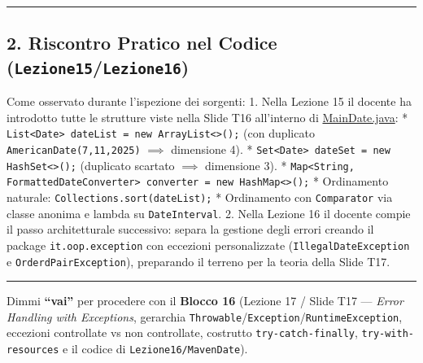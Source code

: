 \documentclass[11pt,a4paper]{article}
\newcommand{\passthrough}[1]{#1}
\begin{document}
\begin{center}\rule{0.5\linewidth}{0.5pt}\end{center}

\subsection{\texorpdfstring{2. Riscontro Pratico nel Codice
(\texttt{Lezione15}/\texttt{Lezione16})}{2. Riscontro Pratico nel Codice (Lezione15/Lezione16)}}\label{riscontro-pratico-nel-codice-lezione15lezione16}

Come osservato durante l'ispezione dei sorgenti: 1. Nella Lezione 15 il
docente ha introdotto tutte le strutture viste nella Slide T16
all'interno di
\href{file:///home/wally/Documenti/GitHub/Programmazione-II/25-26/Teoria-e-Esercitazioni/Codice-20260902/Lezione15/MavenDate/src/main/java/it/oop/ui/MainDate.java}{MainDate.java}:
* \passthrough{\lstinline!List<Date> dateList = new ArrayList<>();!}
(con duplicato \passthrough{\lstinline!AmericanDate(7,11,2025)!}
\(\implies\) dimensione 4). *
\passthrough{\lstinline!Set<Date> dateSet = new HashSet<>();!}
(duplicato scartato \(\implies\) dimensione 3). *
\passthrough{\lstinline!Map<String, FormattedDateConverter> converter = new HashMap<>();!}
* Ordinamento naturale:
\passthrough{\lstinline!Collections.sort(dateList);!} * Ordinamento con
\passthrough{\lstinline!Comparator!} via classe anonima e lambda su
\passthrough{\lstinline!DateInterval!}. 2. Nella Lezione 16 il docente
compie il passo architetturale successivo: separa la gestione degli
errori creando il package \passthrough{\lstinline!it.oop.exception!} con
eccezioni personalizzate (\passthrough{\lstinline!IllegalDateException!}
e \passthrough{\lstinline!OrderdPairException!}), preparando il terreno
per la teoria della Slide T17.

\begin{center}\rule{0.5\linewidth}{0.5pt}\end{center}

Dimmi \textbf{``vai''} per procedere con il \textbf{Blocco 16} (Lezione
17 / Slide T17 --- \emph{Error Handling with Exceptions}, gerarchia
\passthrough{\lstinline!Throwable!}/\passthrough{\lstinline!Exception!}/\passthrough{\lstinline!RuntimeException!},
eccezioni controllate vs non controllate, costrutto
\passthrough{\lstinline!try-catch-finally!},
\passthrough{\lstinline!try-with-resources!} e il codice di
\passthrough{\lstinline!Lezione16/MavenDate!}).
\end{document}
